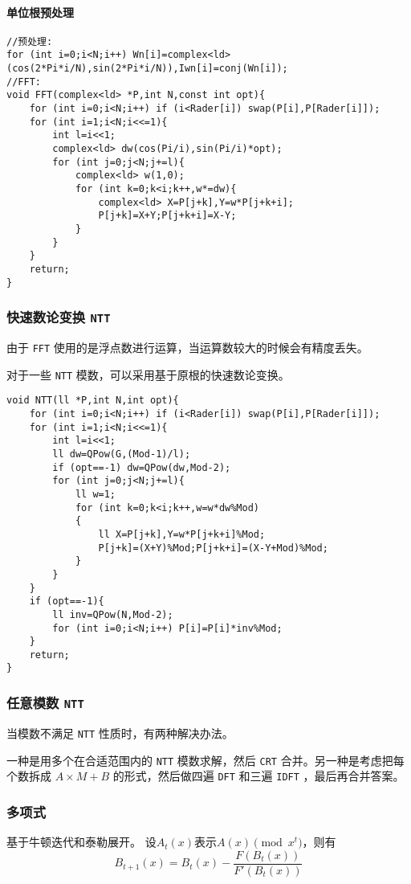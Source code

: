 \documentclass[UTF-8]{ctexart}
\begin{document}
    \paragraph{单位根预处理}
\begin{verbatim}
//预处理:
for (int i=0;i<N;i++) Wn[i]=complex<ld>(cos(2*Pi*i/N),sin(2*Pi*i/N)),Iwn[i]=conj(Wn[i]);
//FFT:
void FFT(complex<ld> *P,int N,const int opt){
    for (int i=0;i<N;i++) if (i<Rader[i]) swap(P[i],P[Rader[i]]);
    for (int i=1;i<N;i<<=1){
        int l=i<<1;
        complex<ld> dw(cos(Pi/i),sin(Pi/i)*opt);
        for (int j=0;j<N;j+=l){
            complex<ld> w(1,0);
            for (int k=0;k<i;k++,w*=dw){
                complex<ld> X=P[j+k],Y=w*P[j+k+i];
                P[j+k]=X+Y;P[j+k+i]=X-Y;
            }
        }
    }
    return;
}
\end{verbatim}
	\subsubsection{快速数论变换 \texttt{NTT}}
	由于 \texttt{FFT} 使用的是浮点数进行运算，当运算数较大的时候会有精度丢失。
	
	对于一些 \texttt{NTT} 模数，可以采用基于原根的快速数论变换。
\begin{verbatim}
void NTT(ll *P,int N,int opt){
    for (int i=0;i<N;i++) if (i<Rader[i]) swap(P[i],P[Rader[i]]);
    for (int i=1;i<N;i<<=1){
        int l=i<<1;
        ll dw=QPow(G,(Mod-1)/l);
        if (opt==-1) dw=QPow(dw,Mod-2);
        for (int j=0;j<N;j+=l){
            ll w=1;
            for (int k=0;k<i;k++,w=w*dw%Mod)
            {
                ll X=P[j+k],Y=w*P[j+k+i]%Mod;
                P[j+k]=(X+Y)%Mod;P[j+k+i]=(X-Y+Mod)%Mod;
            }
        }
    }
    if (opt==-1){
        ll inv=QPow(N,Mod-2);
        for (int i=0;i<N;i++) P[i]=P[i]*inv%Mod;
    }
    return;
}
\end{verbatim}
	\subsubsection{任意模数 \texttt{NTT}}
	当模数不满足 \texttt{NTT} 性质时，有两种解决办法。
	
	一种是用多个在合适范围内的 \texttt{NTT} 模数求解，然后 \texttt{CRT} 合并。另一种是考虑把每个数拆成 $A \times M+B$ 的形式，然后做四遍 \texttt{DFT} 和三遍 \texttt{IDFT} ，最后再合并答案。
	
	\subsubsection{多项式}
	基于牛顿迭代和泰勒展开。
	设$A _ t(x)$表示$A(x) \pmod{x^{t}}$，则有
	$$B _ {t+1}(x)=B _ t(x)-\frac{F(B _ t(x))}{F'(B _ t(x))}$$
	
\end{document}
